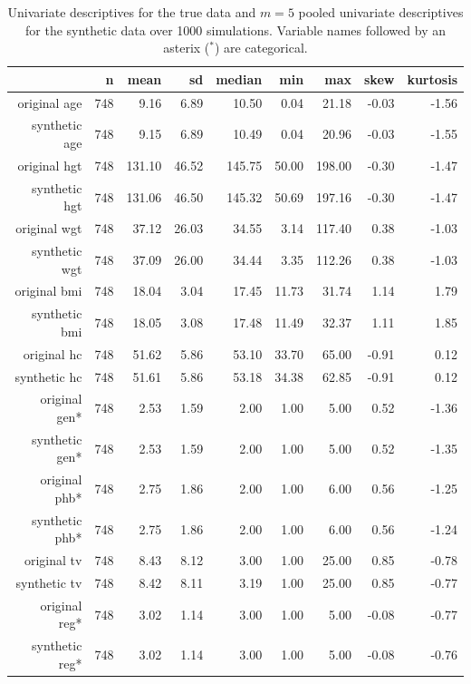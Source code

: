 \documentclass[psych,article,submit,moreauthors,pdftex]{mdpi}
\begin{document}
\begin{table}[ht]
\caption{Univariate descriptives for the true data and $m=5$ pooled univariate descriptives for the synthetic data over 1000 simulations. Variable names followed by an asterix ($^*$) are categorical.}
\centering
\begin{tabular}{rrrrrrrrr}
  \hline
 & n & mean & sd & median & min & max & skew & kurtosis \\ 
  \hline
original age & 748 & 9.16 & 6.89 & 10.50 & 0.04 & 21.18 & -0.03 & -1.56 \\ 
  synthetic age & 748 & 9.15 & 6.89 & 10.49 & 0.04 & 20.96 & -0.03 & -1.55 \\ 
  original hgt & 748 & 131.10 & 46.52 & 145.75 & 50.00 & 198.00 & -0.30 & -1.47 \\ 
  synthetic hgt & 748 & 131.06 & 46.50 & 145.32 & 50.69 & 197.16 & -0.30 & -1.47 \\ 
  original wgt & 748 & 37.12 & 26.03 & 34.55 & 3.14 & 117.40 & 0.38 & -1.03 \\ 
  synthetic wgt & 748 & 37.09 & 26.00 & 34.44 & 3.35 & 112.26 & 0.38 & -1.03 \\ 
  original bmi & 748 & 18.04 & 3.04 & 17.45 & 11.73 & 31.74 & 1.14 & 1.79 \\ 
  synthetic bmi & 748 & 18.05 & 3.08 & 17.48 & 11.49 & 32.37 & 1.11 & 1.85 \\ 
  original hc & 748 & 51.62 & 5.86 & 53.10 & 33.70 & 65.00 & -0.91 & 0.12 \\ 
  synthetic hc & 748 & 51.61 & 5.86 & 53.18 & 34.38 & 62.85 & -0.91 & 0.12 \\ 
  original gen* & 748 & 2.53 & 1.59 & 2.00 & 1.00 & 5.00 & 0.52 & -1.36 \\ 
  synthetic gen* & 748 & 2.53 & 1.59 & 2.00 & 1.00 & 5.00 & 0.52 & -1.35 \\ 
  original phb* & 748 & 2.75 & 1.86 & 2.00 & 1.00 & 6.00 & 0.56 & -1.25 \\ 
  synthetic phb* & 748 & 2.75 & 1.86 & 2.00 & 1.00 & 6.00 & 0.56 & -1.24 \\ 
  original tv & 748 & 8.43 & 8.12 & 3.00 & 1.00 & 25.00 & 0.85 & -0.78 \\ 
  synthetic tv & 748 & 8.42 & 8.11 & 3.19 & 1.00 & 25.00 & 0.85 & -0.77 \\ 
  original reg* & 748 & 3.02 & 1.14 & 3.00 & 1.00 & 5.00 & -0.08 & -0.77 \\ 
  synthetic reg* & 748 & 3.02 & 1.14 & 3.00 & 1.00 & 5.00 & -0.08 & -0.76 \\ 
   \hline
\end{tabular}
\end{table}
\end{document}
